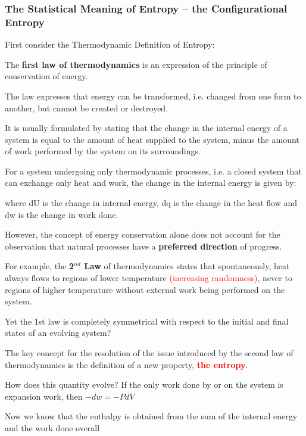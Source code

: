 \documentclass[ignorenonframetext]{beamer}
\begin{document}
\begin{frame}[allowframebreaks=0.65]
\frametitle{The Statistical Meaning of Entropy -- the Configurational Entropy}
 
First consider the Thermodynamic Definition of Entropy:

The \textbf{first law of thermodynamics} is an expression of the principle of conservation of energy.

\medskip The law expresses that energy can be transformed, i.e. changed from one form to another, but cannot be created or destroyed.

\medskip It is usually formulated by stating that the change in the internal energy of a system is equal to the amount of heat supplied to the system, minus the amount of work performed by the system on its surroundings.


\medskip For a system undergoing only thermodynamic processes, i.e. a closed system that can exchange only heat and work, the change in the internal energy is given by:
\begin{center}  \end{center}

where dU is the change in internal energy, dq is the change in the heat flow and dw is the change in work done. 


\medskip However, the concept of energy conservation alone does not account for the observation that natural processes have a \textbf{preferred direction} of progress. 

 
\medskip For example, the \textbf{2\(^{nd}\) Law} of thermodynamics states that spontaneously, heat always flows to regions of lower temperature \textcolor{red}{(increasing randomness)}, never to regions of higher temperature without external work being performed on the system.  

 
\medskip Yet the 1st law is completely symmetrical with respect to the initial and final states of an evolving system?


\medskip The key concept for the resolution of the issue introduced by the second law of thermodynamics is the definition of a new property, \textcolor{red}{\textbf{the entropy}}.


\medskip How does this quantity evolve?
If the only work done by or on the system is expansion work, then  \(-dw = -PdV\)


\medskip Now we know that the enthalpy is obtained from the sum of the internal energy and the work done overall


\end{frame}
\end{document}
